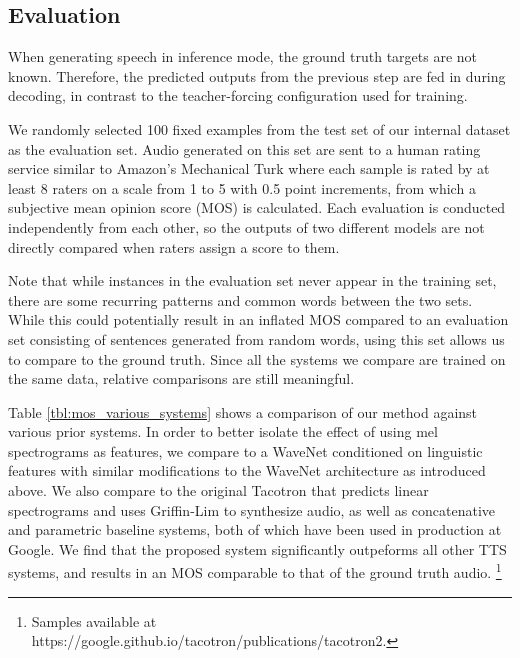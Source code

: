 \subsection{Evaluation}

When generating speech in inference mode, the ground truth targets are
not known.  Therefore, the predicted outputs from the previous step
are fed in during decoding, in contrast to the teacher-forcing
configuration used for training.

We randomly selected 100 fixed examples from the test set of our internal
dataset as the evaluation set.
Audio generated on this set are sent to a human rating service similar to
Amazon's Mechanical Turk where each sample is rated by at least 8 raters on a
scale from 1 to 5 with 0.5 point increments, from which a subjective mean opinion score
(MOS) is calculated. Each evaluation is conducted independently from each other,
so the outputs of two different models are not directly compared when
raters assign a score to them.

Note that while instances in the evaluation set never appear in the training
set, there are some recurring patterns and common words between the two sets.
While this could potentially result in an inflated MOS compared to
an evaluation set consisting of sentences generated from random words, using
this set allows us to compare to the ground truth.  Since all the systems
we compare are trained on the same data, relative comparisons are still
meaningful.

Table \ref{tbl:mos_various_systems} shows
a comparison of our method against various prior systems.
In order to better isolate the effect of using mel spectrograms as features,
we compare to a WaveNet conditioned on linguistic features\cite{45774} with similar
modifications to the WaveNet architecture as introduced above. We also compare
to the original
Tacotron that predicts linear spectrograms and uses Griffin-Lim to synthesize
audio, as well as concatenative \cite{gonzalvo2016recent} and parametric
\cite{zen2016fast} baseline systems, both of which have been used in production at Google.
We find that the proposed system significantly outpeforms all other TTS systems,
and results in an MOS comparable to that of the ground truth audio.
\footnote[2]{Samples available at https://google.github.io/tacotron/publications/tacotron2.}

